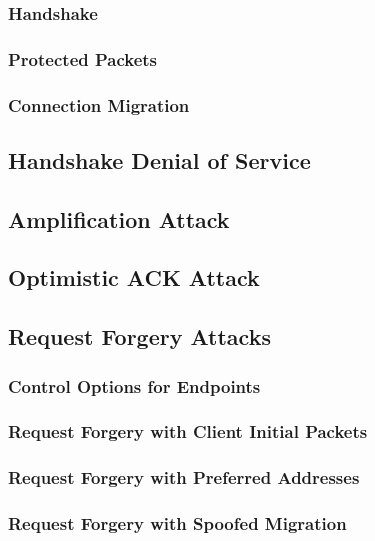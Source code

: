 \documentclass{article}
\begin{document}
\subsubsection{Handshake}

\subsubsection{Protected Packets}

\subsubsection{Connection Migration}

\subsection{Handshake Denial of Service}

\subsection{Amplification Attack}

\subsection{Optimistic ACK Attack}

\subsection{Request Forgery Attacks}

\subsubsection{Control Options for Endpoints}

\subsubsection{Request Forgery with Client Initial Packets}

\subsubsection{Request Forgery with Preferred Addresses}

\subsubsection{Request Forgery with Spoofed Migration}
\end{document}
